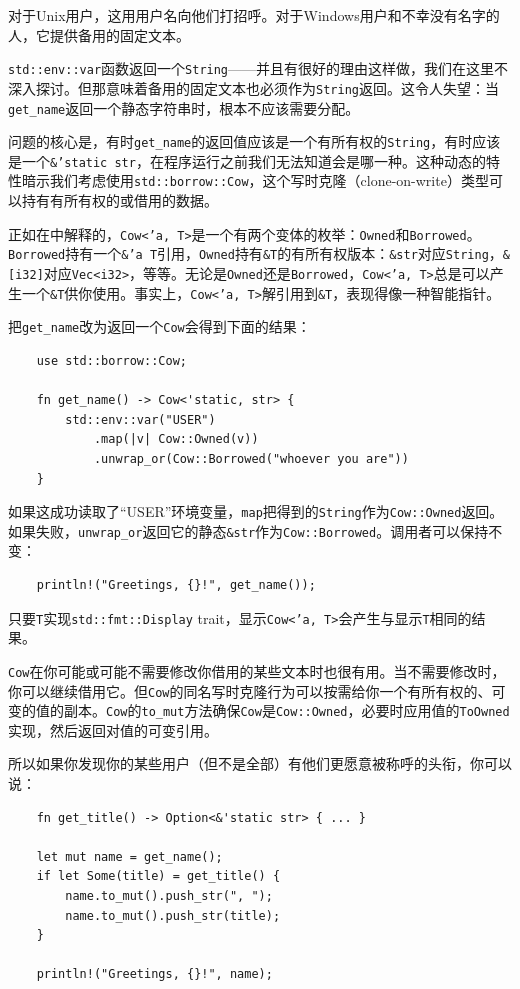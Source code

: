 对于Unix用户，这用用户名向他们打招呼。对于Windows用户和不幸没有名字的人，它提供备用的固定文本。

\texttt{std::env::var}函数返回一个\texttt{String}——并且有很好的理由这样做，我们在这里不深入探讨。但那意味着备用的固定文本也必须作为\texttt{String}返回。这令人失望：当\texttt{get\_name}返回一个静态字符串时，根本不应该需要分配。

问题的核心是，有时\texttt{get\_name}的返回值应该是一个有所有权的\texttt{String}，有时应该是一个\texttt{\&'static str}，在程序运行之前我们无法知道会是哪一种。这种动态的特性暗示我们考虑使用\texttt{std::borrow::Cow}，这个写时克隆（clone-on-write）类型可以持有有所有权的或借用的数据。

正如在中解释的，\texttt{Cow<'a, T>}是一个有两个变体的枚举：\texttt{Owned}和\texttt{Borrowed}。\texttt{Borrowed}持有一个\texttt{\&'a T}引用，\texttt{Owned}持有\texttt{\&T}的有所有权版本：\texttt{\&str}对应\texttt{String}，\texttt{\&[i32]}对应\texttt{Vec<i32>}，等等。无论是\texttt{Owned}还是\texttt{Borrowed}，\texttt{Cow<'a, T>}总是可以产生一个\texttt{\&T}供你使用。事实上，\texttt{Cow<'a, T>}解引用到\texttt{\&T}，表现得像一种智能指针。

把\texttt{get\_name}改为返回一个\texttt{Cow}会得到下面的结果：
\begin{verbatim}
    use std::borrow::Cow;

    fn get_name() -> Cow<'static, str> {
        std::env::var("USER")
            .map(|v| Cow::Owned(v))
            .unwrap_or(Cow::Borrowed("whoever you are"))
    }
\end{verbatim}

如果这成功读取了“USER”环境变量，\texttt{map}把得到的\texttt{String}作为\texttt{Cow::Owned}返回。如果失败，\texttt{unwrap\_or}返回它的静态\texttt{\&str}作为\texttt{Cow::Borrowed}。调用者可以保持不变：
\begin{verbatim}
    println!("Greetings, {}!", get_name());
\end{verbatim}

只要\texttt{T}实现\texttt{std::fmt::Display} trait，显示\texttt{Cow<'a, T>}会产生与显示\texttt{T}相同的结果。

\texttt{Cow}在你可能或可能不需要修改你借用的某些文本时也很有用。当不需要修改时，你可以继续借用它。但\texttt{Cow}的同名写时克隆行为可以按需给你一个有所有权的、可变的值的副本。\texttt{Cow}的\texttt{to\_mut}方法确保\texttt{Cow}是\texttt{Cow::Owned}，必要时应用值的\texttt{ToOwned}实现，然后返回对值的可变引用。

所以如果你发现你的某些用户（但不是全部）有他们更愿意被称呼的头衔，你可以说：
\begin{verbatim}
    fn get_title() -> Option<&'static str> { ... }

    let mut name = get_name();
    if let Some(title) = get_title() {
        name.to_mut().push_str(", ");
        name.to_mut().push_str(title);
    }

    println!("Greetings, {}!", name);
\end{verbatim}

